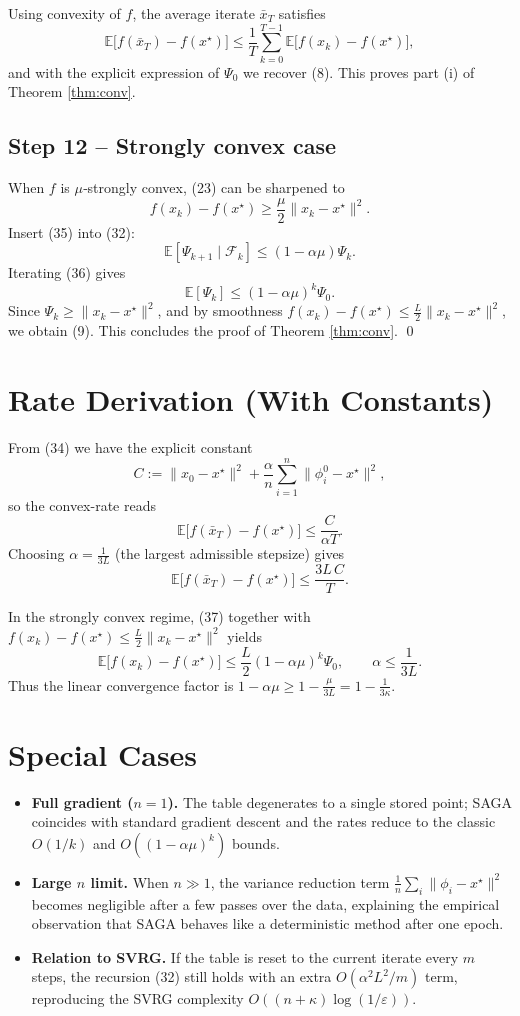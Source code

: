 \documentclass{article}
\newcommand{\E}{\mathbb{E}}
\begin{document}
Using convexity of $f$, the average iterate $\bar x_T$ satisfies
\[
\E\bigl[f(\bar x_T)-f(x^\star)\bigr]\le\frac{1}{T}\sum_{k=0}^{T-1}\E\bigl[f(x_k)-f(x^\star)\bigr],
\]
and with the explicit expression of $\Psi_0$ we recover (8). This proves part (i) of Theorem \ref{thm:conv}.

\subsection*{Step 12 – Strongly convex case}
When $f$ is $\mu$‑strongly convex, (23) can be sharpened to
\[
f(x_k)-f(x^\star)\ge\frac{\mu}{2}\|x_k-x^\star\|^2.
\tag{35}
\]
Insert (35) into (32):
\[
\E[\Psi_{k+1}\mid\mathcal F_k]\le (1-\alpha\mu)\Psi_k.
\tag{36}
\]
Iterating (36) gives
\[
\E[\Psi_k]\le (1-\alpha\mu)^{k}\Psi_0.
\tag{37}
\]
Since $\Psi_k\ge\|x_k-x^\star\|^2$, and by smoothness $f(x_k)-f(x^\star)\le\frac{L}{2}\|x_k-x^\star\|^2$, we obtain (9). This concludes the proof of Theorem \ref{thm:conv}. \qed

\section*{Rate Derivation (With Constants)}
From (34) we have the explicit constant
\[
C:=\|x_0-x^\star\|^2+\frac{\alpha}{n}\sum_{i=1}^{n}\|\phi_i^{0}-x^\star\|^2,
\]
so the convex-rate reads
\[
\E\bigl[f(\bar x_T)-f(x^\star)\bigr]\le\frac{C}{\alpha T}.
\]
Choosing $\alpha=\frac{1}{3L}$ (the largest admissible stepsize) gives
\[
\E\bigl[f(\bar x_T)-f(x^\star)\bigr]\le\frac{3L\,C}{T}.
\]

In the strongly convex regime, (37) together with $f(x_k)-f(x^\star)\le\frac{L}{2}\|x_k-x^\star\|^2$ yields
\[
\E\bigl[f(x_k)-f(x^\star)\bigr]\le
\frac{L}{2}(1-\alpha\mu)^{k}\Psi_0,
\qquad\alpha\le\frac{1}{3L}.
\]
Thus the linear convergence factor is $1-\alpha\mu\ge 1-\frac{\mu}{3L}=1-\frac{1}{3\kappa}$.

\section*{Special Cases}
\begin{itemize}
\item \textbf{Full gradient ($n=1$).} The table degenerates to a single stored point; SAGA coincides with standard gradient descent and the rates reduce to the classic $O(1/k)$ and $O((1-\alpha\mu)^k)$ bounds.
\item \textbf{Large $n$ limit.} When $n\gg1$, the variance reduction term $\frac{1}{n}\sum_i\|\phi_i-x^\star\|^2$ becomes negligible after a few passes over the data, explaining the empirical observation that SAGA behaves like a deterministic method after one epoch.
\item \textbf{Relation to SVRG.} If the table is reset to the current iterate every $m$ steps, the recursion (32) still holds with an extra $O(\alpha^2L^2/m)$ term, reproducing the SVRG complexity $O((n+\kappa)\log(1/\varepsilon))$.
\end{itemize}
\end{document}
